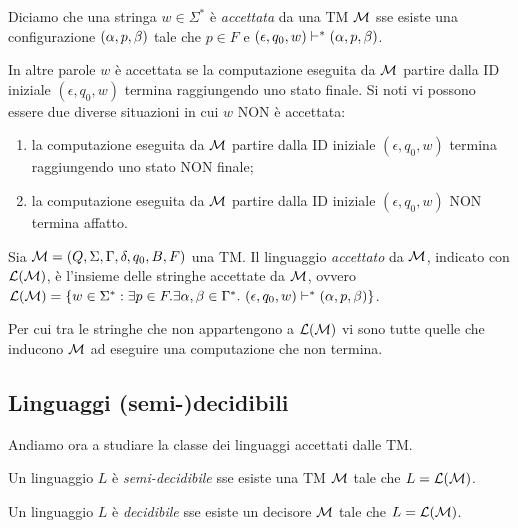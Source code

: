 \documentclass[runningheads,a4paper]{llncs}
\begin{document}
\begin{definition}[Accettazione]\label{def:lang-acc-TM}
Diciamo che una stringa $w \in \Sigma^*$ \`{e} \emph{accettata} da una TM $\mathcal{M}$ sse esiste una configurazione $(\alpha,p,\beta)$ tale che $p \in F$ e $(\epsilon,q_0,w) \vdash^* (\alpha,p,\beta)$.
\end{definition}

In altre parole $w$ \`{e} accettata se la computazione eseguita da $\mathcal{M}$ partire dalla ID iniziale $(\epsilon,q_0,w)$ termina raggiungendo uno stato finale. Si noti vi possono essere due diverse situazioni in cui $w$ NON \`{e} accettata:
\begin{enumerate}
\item la computazione eseguita da $\mathcal{M}$ partire dalla ID iniziale $(\epsilon,q_0,w)$ termina raggiungendo uno stato NON finale;
\item la computazione eseguita da $\mathcal{M}$ partire dalla ID iniziale $(\epsilon,q_0,w)$ NON termina affatto.
\end{enumerate} 

\begin{definition}\label{def:lang-acc-TM}
Sia $\mathcal{M} = (Q,\Sigma,\Gamma,\delta,q_0,B,F)$ una TM. Il linguaggio \emph{accettato} da $\mathcal{M}$, indicato con $\mathcal{L}(\mathcal{M})$, \`{e} l'insieme delle stringhe accettate da $\mathcal{M}$, ovvero $\mathcal{L}(\mathcal{M}) = \{w \in \Sigma^* : \exists p \in F.\exists \alpha,\beta \in \Gamma^*.\ (\epsilon,q_0,w) \vdash^* (\alpha,p,\beta) \}$.
\end{definition}

Per cui tra le stringhe che non appartengono a $\mathcal{L}(\mathcal{M})$ vi sono tutte quelle che inducono $\mathcal{M}$ ad eseguire una computazione che non termina.

\subsection{Linguaggi (semi-)decidibili}

Andiamo ora a studiare la classe dei linguaggi accettati dalle TM.

\begin{definition}\label{def:semi-dec-ling}
Un linguaggio $L$ \`{e} \emph{semi-decidibile} sse esiste una TM $\mathcal{M}$ tale che $L = \mathcal{L}(\mathcal{M})$.
\end{definition}

\begin{definition}\label{def:dec-ling}
Un linguaggio $L$ \`{e} \emph{decidibile} sse esiste un decisore $\mathcal{M}$ tale che $L = \mathcal{L}(\mathcal{M})$.
\end{definition}
\end{document}
